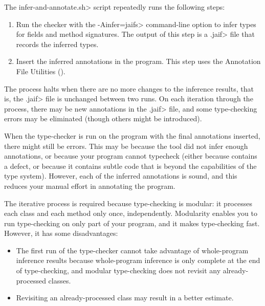 The \<infer-and-annotate.sh> script repeatedly runs the following steps:
\begin{enumerate}
\item Run the checker with the \<-Ainfer=jaifs> command-line option to infer
  types for fields and method signatures.  The output of this step
  is a \<.jaif> file that records the inferred types.
\item Insert the inferred annotations in the program.  This step uses the
  Annotation File Utilities
  ().
\end{enumerate}

The process halts when there are no more changes to the inference results,
that is, the \<.jaif> file is unchanged between two runs.  On each
iteration through the process, there may be new annotations in the \<.jaif>
file, and some type-checking errors may be eliminated (though others might
be introduced).

When the type-checker is run on the program with the final annotations
inserted, there might still be errors.  This may be because the tool did
not infer enough annotations, or because your program cannot typecheck
(either because contains a defect, or because it contains subtle code that
is beyond the capabilities of the type system).
However, each of the inferred annotations is sound, and this reduces your
manual effort in annotating the program.

The iterative process is required because type-checking is modular:  it
processes each class and each method only once, independently.  Modularity
enables you to run type-checking on only part of your program, and it makes
type-checking fast.  However, it has some disadvantages:
\begin{itemize}
\item
  The first run of the type-checker cannot take advantage of whole-program
  inference results because whole-program inference is only complete at the
  end of type-checking, and modular type-checking does not revisit any
  already-processed classes.
\item
  Revisiting an
  already-processed class may result in a better estimate.
\end{itemize}



